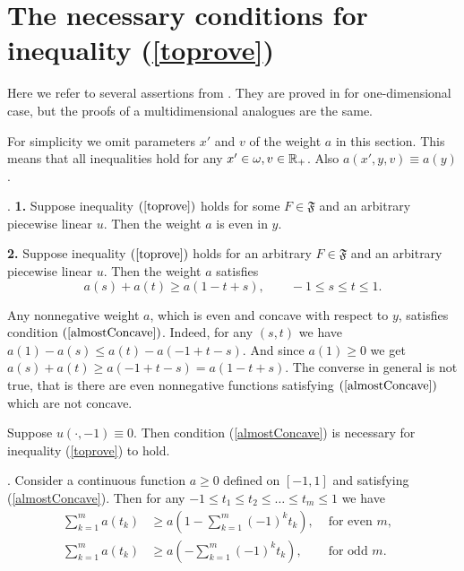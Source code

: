 \section{The necessary conditions for inequality (\ref{toprove})}

Here we refer to several assertions from \cite{1dim}.
They are proved in \cite{1dim} for one-dimensional case, but the proofs of a multidimensional analogues are the same.

For simplicity we omit parameters $x'$ and $v$ of the weight $a$ in this section.
This means that all inequalities hold for any $x' \in \omega, v \in \mathbb R_+$.
Also $a( x', y, v ) \equiv a( y )$.

\begin{prop}
{\rm \cite[Theorem 1]{1dim}.}
{\bf 1.} Suppose inequality $(\ref{toprove})$ holds for some $F \in \mathfrak{F}$
and an arbitrary piecewise linear $u$.
Then the weight $a$ is even in $y$.

{\bf 2.} Suppose inequality $(\ref{toprove})$ holds for an arbitrary $F \in \mathfrak{F}$
and an arbitrary piecewise linear $u$.
Then the weight $a$ satisfies
\begin{equation}
\label{almostConcave}
a( s ) + a( t ) \ge a( 1 - t + s ), \qquad -1 \le s \le t \le 1.
\end{equation}
\end{prop}

\begin{rem}
Any nonnegative weight $a$, which is even and concave with respect to $y$, satisfies condition $(\ref{almostConcave})$.
Indeed, for any $(s, t)$ we have $a( 1 ) - a( s ) \le a( t ) - a( -1 + t - s )$.
And since $a( 1 ) \ge 0$ we get $a( s ) + a( t ) \ge a( -1 + t - s ) = a( 1 - t + s )$.
The converse in general is not true, that is there are even nonnegative functions satisfying $(\ref{almostConcave})$ which are not concave.
\end{rem}

\begin{rem}
\label{lanNec}
Suppose $u(\cdot, -1) \equiv 0$.
Then condition (\ref{almostConcave}) is necessary for inequality (\ref{toprove}) to hold.
\end{rem}

\begin{prop}
\label{weightSum}
{\rm \cite[Lemma 1]{1dim}.}
Consider a continuous function $a \ge 0$ defined on $[-1,1]$
and satisfying (\ref{almostConcave}).
Then for any $-1 \le t_1 \le t_2 \le \ldots \le t_m \le 1$ we have
\begin{align*}
\sum\limits_{k=1}^m a(t_k) & \ge a( 1 - \sum\limits_{k = 1}^m (-1)^k t_k ), & \text{ for even $m$},&\\
\sum\limits_{k=1}^m a(t_k) & \ge a( -\sum\limits_{k = 1}^m (-1)^k t_k ),    & \text{ for odd $m$}.&
\end{align*}
\end{prop}
